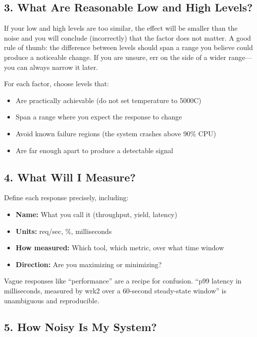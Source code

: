 \documentclass[11pt]{book}
\begin{document}
\subsection{3. What Are Reasonable Low and High Levels?}

\begin{warning}
If your low and high levels are too similar, the effect will be smaller than the
noise and you will conclude (incorrectly) that the factor does not matter. A
good rule of thumb: the difference between levels should span a range you
believe could produce a noticeable change. If you are unsure, err on the side of
a wider range---you can always narrow it later.
\end{warning}

For each factor, choose levels that:
\begin{itemize}[nosep]
\item Are practically achievable (do not set temperature to 5000\textdegree C)
\item Span a range where you expect the response to change
\item Avoid known failure regions (the system crashes above 90\% CPU)
\item Are far enough apart to produce a detectable signal
\end{itemize}

\subsection{4. What Will I Measure?}

Define each response precisely, including:
\begin{itemize}[nosep]
\item \textbf{Name:} What you call it (throughput, yield, latency)
\item \textbf{Units:} req/sec, \%, milliseconds
\item \textbf{How measured:} Which tool, which metric, over what time window
\item \textbf{Direction:} Are you maximizing or minimizing?
\end{itemize}

Vague responses like ``performance'' are a recipe for confusion. ``p99 latency in
milliseconds, measured by wrk2 over a 60-second steady-state window'' is
unambiguous and reproducible.

\subsection{5. How Noisy Is My System?}
\end{document}
